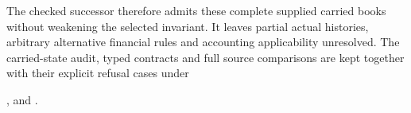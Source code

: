 The checked successor therefore admits these complete supplied carried books
without weakening the selected invariant. It leaves partial actual histories,
arbitrary alternative financial rules and accounting applicability unresolved.
The carried-state audit, typed contracts and full source comparisons are kept
together with their explicit refusal cases under
\begingroup\raggedright
{},
and .
\par\endgroup
